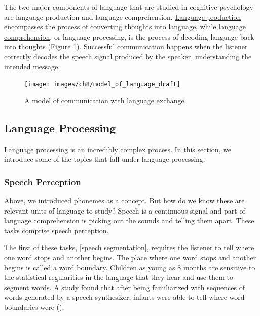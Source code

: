 \documentclass[
]{krantz}
\begin{document}
The two major components of language that are studied in cognitive psychology are language production and language comprehension. \hyperref[langproddef]{Language production} encompasses the process of converting thoughts into language, while \hyperref[language-comprehension]{language comprehension}, or language processing, is the process of decoding language back into thoughts (Figure \ref{fig:model}). Successful communication happens when the listener correctly decodes the speech signal produced by the speaker, understanding the intended message.

\begin{figure}

{\centering \texttt{[image: images/ch8/model\_of\_language\_draft]} 

}

\caption{A model of communication with language exchange.}\label{fig:model}
\end{figure}

\subsection*{Language Processing}\label{language-processing}


Language processing is an incredibly complex process. In this section, we introduce some of the topics that fall under language processing.

\subsubsection*{Speech Perception}\label{speech-perception}


Above, we introduced phonemes as a concept. But how do we know these are relevant units of language to study? Speech is a continuous signal and part of language comprehension is picking out the sounds and telling them apart. These tasks comprise speech perception.

The first of these tasks, {[}speech segmentation{]}, requires the listener to tell where one word stops and another begins. The place where one word stops and another begins is called a word boundary. Children as young as 8 months are sensitive to the statistical regularities in the language that they hear and use them to segment words. A study found that after being familiarized with sequences of words generated by a speech synthesizer, infants were able to tell where word boundaries were ().
\end{document}

